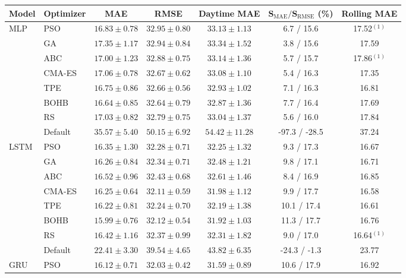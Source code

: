 \begin{tabular}{llccccc}
\toprule
\textbf{Model} & \textbf{Optimizer} & \textbf{MAE} & \textbf{RMSE} & \textbf{Daytime MAE} & $\boldsymbol{S_{\mathrm{MAE}}/S_{\mathrm{RMSE}}}$ \textbf{(\%)} & \textbf{Rolling MAE} \\
\midrule
MLP & PSO & $16.83 \pm 0.78$ & $32.95 \pm 0.80$ & $33.13 \pm 1.13$ & 6.7 / 15.6 & 17.52$^{(1)}$ \\
 & GA & $17.35 \pm 1.17$ & $32.94 \pm 0.84$ & $33.34 \pm 1.52$ & 3.8 / 15.6 & 17.59 \\
 & ABC & $17.00 \pm 1.23$ & $32.88 \pm 0.75$ & $33.14 \pm 1.36$ & 5.7 / 15.7 & 17.86$^{(1)}$ \\
 & CMA-ES & $17.06 \pm 0.78$ & $32.67 \pm 0.62$ & $33.08 \pm 1.10$ & 5.4 / 16.3 & 17.35 \\
 & TPE & $16.75 \pm 0.86$ & $32.66 \pm 0.56$ & $32.93 \pm 1.02$ & 7.1 / 16.3 & 16.81 \\
 & BOHB & $\mathbf{16.64} \pm 0.85$ & $32.64 \pm 0.79$ & $32.87 \pm 1.36$ & 7.7 / 16.4 & 17.69 \\
 & RS & $17.03 \pm 0.82$ & $32.79 \pm 0.75$ & $33.04 \pm 1.37$ & 5.6 / 16.0 & 17.84 \\
 & Default & $35.57 \pm 5.40$ & $50.15 \pm 6.92$ & $54.42 \pm 11.28$ & -97.3 / -28.5 & 37.24 \\
\midrule
LSTM & PSO & $16.35 \pm 1.30$ & $32.28 \pm 0.71$ & $32.25 \pm 1.32$ & 9.3 / 17.3 & 16.67 \\
 & GA & $16.26 \pm 0.84$ & $32.34 \pm 0.71$ & $32.48 \pm 1.21$ & 9.8 / 17.1 & 16.71 \\
 & ABC & $16.52 \pm 0.96$ & $32.43 \pm 0.68$ & $32.61 \pm 1.46$ & 8.4 / 16.9 & 16.85 \\
 & CMA-ES & $16.25 \pm 0.64$ & $32.11 \pm 0.59$ & $31.98 \pm 1.12$ & 9.9 / 17.7 & 16.58 \\
 & TPE & $16.22 \pm 0.81$ & $32.24 \pm 0.70$ & $32.19 \pm 1.38$ & 10.1 / 17.4 & 16.61 \\
 & BOHB & $\mathbf{15.99} \pm 0.76$ & $32.12 \pm 0.54$ & $31.92 \pm 1.03$ & 11.3 / 17.7 & 16.76 \\
 & RS & $16.42 \pm 1.16$ & $32.37 \pm 0.99$ & $32.31 \pm 1.82$ & 9.0 / 17.0 & 16.64$^{(1)}$ \\
 & Default & $22.41 \pm 3.30$ & $39.54 \pm 4.65$ & $43.82 \pm 6.35$ & -24.3 / -1.3 & 23.77 \\
\midrule
GRU & PSO & $\mathbf{16.12} \pm 0.71$ & $32.03 \pm 0.42$ & $31.59 \pm 0.89$ & 10.6 / 17.9 & 16.92 \\

\end{tabular}
